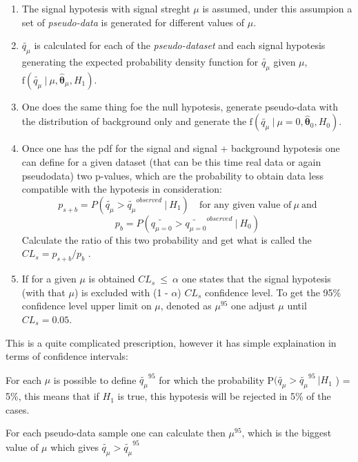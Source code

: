 \begin{enumerate}
	\item The signal hypotesis with signal streght $\mu$ is assumed, under this assumpion a set of 
	\textit{pseudo-data} is generated for different values of $\mu$.

	\item  $\tilde{q_{\mu}}$ is calculated for each of the \textit{pseudo-dataset} and each signal hypotesis generating
	the expected probability density function for $\tilde{q_{\mu}}$ given $\mu$, 
	$\text{f}(\tilde{q_{\mu}} ~| ~ \mu, \hat{\boldsymbol{\theta}}_{\mu},H_1)$.

	\item One does the same thing foe the null hypotesis, generate pseudo-data with the distribution of background only and 
	generate  the $\text{f}(\tilde{q_{\mu}} ~ | ~ \mu = 0, \hat{\boldsymbol{\theta}}_{0}, H_0)$.

	\item Once one has the pdf for the signal and signal + background hypotesis one can define for a given dataset (that can be this time
	real data or again pseudodata)  two p-values, which are the probability to obtain data less compatible with the hypotesis in consideration:
	$$
	p_{s+b} = P(\tilde{q_{\mu}} > \tilde{q_{\mu}}^{observed} ~ | ~ H_1)  \quad \text{for any given value of} ~  \mu ~ \text{and}$$
	$$ 
	p_{b} = P(\tilde{q_{\mu=0}} > \tilde{q_{\mu=0}}^{observed} ~ | ~ H_0)
	$$
	Calculate the ratio of this two probability and get what is called the $CL_{s} = p_{s+b} / p_{b}$ \cite{}.

	\item If for a given $\mu$ is obtained $CL_{s} ~ \leq ~ \alpha $ one states that the signal hypotesis (with that $\mu$) 
	is excluded with (1 - $\alpha$) $CL_{s}$ confidence level. To get the 95\% confidence level upper limit on $\mu$,
	denoted as $\mu^{95}$ one adjust $\mu$ until $CL_{s} = 0.05$. 
\end{enumerate}
This is a quite complicated prescription, however it has simple explaination in terms of confidence intervals:

For each $\mu$ is possible to define $\tilde{q_{\mu}}^{95}$ for which the probability P$(\tilde{q_{\mu}} > \tilde{q_{\mu}}^{95} ~ | H_1$ ) = 5\%,
	this means that if $H_1$ is true, this hypotesis will be rejected in 5\% of the cases.

 For each pseudo-data sample one can calculate then $\mu^{95}$, which is the biggest value of $\mu$ which gives $\tilde{q_{\mu}} > \tilde{q_{\mu}}^{95}$

